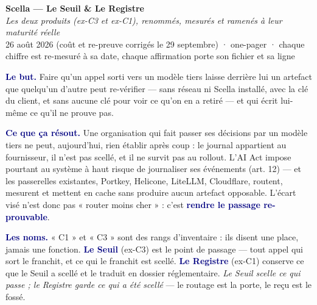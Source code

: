\documentclass[9pt]{extarticle}
\newcommand{\mm}[1]{\textbf{\textcolor{navy}{#1}}}
\begin{document}
\begin{center}
{\LARGE\bfseries\color{navy} Scella — Le Seuil \& Le Registre}\\[2pt]
{\small\color{grey}\itshape Les deux produits (ex-C3 et ex-C1), renommés, mesurés et ramenés à leur maturité réelle}\\[2pt]
{\footnotesize\color{grey} 26 août 2026 (coût et re-preuve corrigés le 29 septembre) \; · \; one-pager \; · \; chaque chiffre est re-mesuré à sa date, chaque affirmation porte son fichier et sa ligne}
\end{center}
\vspace{1pt}

\begin{these}
\mm{Le but.} Faire qu'un appel sorti vers un modèle tiers laisse derrière lui un artefact que quelqu'un d'autre peut re-vérifier — sans réseau ni Scella installé, avec la clé du client, et sans aucune clé pour voir ce qu'on en a retiré — et qui écrit lui-même ce qu'il ne prouve pas.

\mm{Ce que ça résout.} Une organisation qui fait passer ses décisions par un modèle tiers ne peut, aujourd'hui, rien établir après coup : le journal appartient au fournisseur, il n'est pas scellé, et il ne survit pas au rollout. L'AI Act impose pourtant au système à haut risque de journaliser ses événements (art. 12) — et les passerelles existantes, Portkey, Helicone, LiteLLM, Cloudflare, routent, mesurent et mettent en cache sans produire aucun artefact opposable. L'écart visé n'est donc pas « router moins cher » : c'est \mm{rendre le passage re-prouvable}.

\mm{Les noms.} « C1 » et « C3 » sont des rangs d'inventaire : ils disent une place, jamais une fonction. \mm{Le Seuil} (ex-C3) est le point de passage — tout appel qui sort le franchit, et ce qui le franchit est scellé. \mm{Le Registre} (ex-C1) conserve ce que le Seuil a scellé et le traduit en dossier réglementaire. \emph{Le Seuil scelle ce qui passe ; le Registre garde ce qui a été scellé} — le routage est la porte, le reçu est le fossé.
\end{these}
\end{document}
